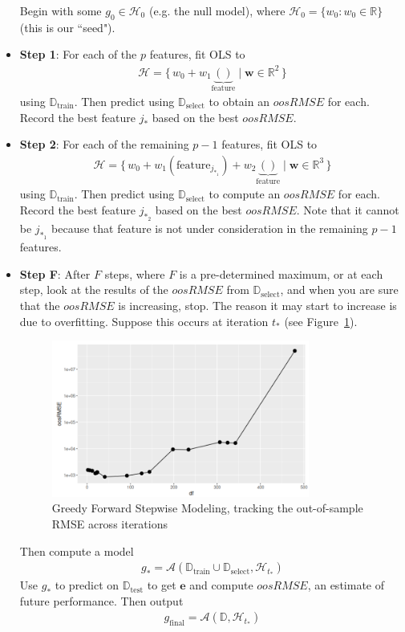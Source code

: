 \documentclass[12pt, a4paper]{article}
\theoremstyle{definition}
\newcommand{\test}{\text{test}}
\newcommand{\train}{\text{train}}
\newcommand{\select}{\text{select}}
\newcommand{\Dtest}{\mathbb{D}_{\test}}
\newcommand{\Dtrain}{\mathbb{D}_{\train}}
\newcommand{\Dselect}{\mathbb{D}_{\select}}
\begin{document}
\begin{itemize}
		Begin with some $g_0\in\mathcal{H}_0$ (e.g. the null model), where
		$\mathcal{H}_0=\{w_0:w_0\in \mathbb{R}\}$ (this is our ``seed").
		\item \textbf{Step 1}: For each of the $p$ features, fit OLS to
		\begin{align*}
			\mathcal{H} = \{\,
			w_0+w_1\underbrace{()}_{\text{feature}}\mid \bm{w}\in\mathbb{R}^2
			\,\}
		\end{align*}
		using $\Dtrain$. Then predict using $\Dselect$ to obtain an $oosRMSE$ for each.
		Record the best feature $j_*$ based on the best $oosRMSE$.
		\item \textbf{Step 2}: For each of the remaining $p-1$ features, fit OLS to
		\begin{align*}
			\mathcal{H} = \{\,
			w_0 + w_1(\text{feature}_{j_{*_1}}) + w_2\underbrace{()}_{\text{feature}} \mid
			\bm{w}\in\mathbb{R}^3
			\,\}
		\end{align*}
		using $\Dtrain$. Then predict using $\mathbb{D}_\select$ to compute an $oosRMSE$ for
		each. Record the best feature $j_{*_2}$ based on the best $oosRMSE$.
		Note that it cannot be $j_{*_1}$ because that feature is not under consideration
		in the remaining $p-1$ features.
		\item \textbf{Step F}: After $F$ steps, where $F$ is a pre-determined maximum, or
		at each step, look at the results of the $oosRMSE$ from $\Dselect$, and when you
		are sure that the $oosRMSE$ is increasing, stop. The reason it may start to
		increase is due to overfitting. Suppose this occurs at iteration $t_*$
		(see Figure~\ref{fig:greedy-stepwise-oosRMSE}).
		\begin{figure}
			\centering
			\includegraphics[width=0.8\textwidth]{greedy-forward-stepwise-oosRMSE-by-iteration}
			\caption{Greedy Forward Stepwise Modeling, tracking the out-of-sample RMSE
			across iterations}
			\label{fig:greedy-stepwise-oosRMSE}
		\end{figure}
		Then compute a model
		\begin{align*}
			g_* = \mathcal{A}(\Dtrain \cup \Dselect, \mathcal{H}_{t_*})
		\end{align*}
		Use $g_*$ to predict on $\Dtest$ to get $\bm{e}$ and compute $oosRMSE$, an
		estimate of future performance. Then output
		\begin{align*}
			g_{\text{final}} = \mathcal{A}(\mathbb{D}, \mathcal{H}_{t_*})
		\end{align*}
	\end{itemize}
\end{document}
